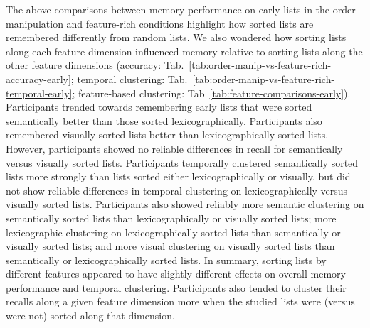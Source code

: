 \documentclass[11pt]{article}
\newcommand{\abbreviations}{S1}
\begin{document}
\begin{table}[tp]
\centering
\tiny

    
\caption{\textbf{Comparing temporal clustering on early lists in different order manipulation
conditions.} The $t$-tests reported in the table were
carried out across-participants, and reflect data aggregated across all early lists
from each participant. Abbreviations used in this table are defined in
Table~\abbreviations.}

\label{tab:order-temporal-comparisons-early}
\end{table}

\begin{table}[tp]
\centering
\tiny

    
\caption{\textbf{Comparing feature-based clustering on early lists in different order manipulation
conditions.} The $t$-tests reported in the table were
carried out across-participants, and reflect data aggregated across all early lists
from each participant. The feature used to compute clustering is shown before the colon in each row, and the
conditions being compared are shown after the colon.  Abbreviations used in this table are defined in
Table~\abbreviations.}

\label{tab:feature-comparisons-early}
\end{table}



The above comparisons between memory performance on early lists in the order
manipulation and feature-rich conditions highlight how sorted lists are
remembered differently from random lists. We also wondered how sorting lists
along each feature dimension influenced memory relative to sorting lists along
the other feature dimensions (accuracy:
Tab.~\ref{tab:order-manip-vs-feature-rich-accuracy-early}; temporal clustering:
Tab.~\ref{tab:order-manip-vs-feature-rich-temporal-early}; feature-based
clustering: Tab~\ref{tab:feature-comparisons-early}). Participants trended
towards remembering early lists that were sorted semantically better than those
sorted lexicographically. Participants also remembered visually sorted lists
better than lexicographically sorted lists. However, participants showed no
reliable differences in recall for semantically versus visually sorted lists.
Participants temporally clustered semantically sorted lists more strongly than
lists sorted either lexicographically or visually, but did not show reliable
differences in temporal clustering on lexicographically versus visually sorted
lists. Participants also showed reliably more semantic clustering on
semantically sorted lists than lexicographically or visually sorted lists; more
lexicographic clustering on lexicographically sorted lists than semantically or
visually sorted lists; and more visual clustering on visually sorted lists than
semantically or lexicographically sorted lists. In summary, sorting lists by
different features appeared to have slightly different effects on overall
memory performance and temporal clustering. Participants also tended to cluster
their recalls along a given feature dimension more when the studied lists were
(versus were not) sorted along that dimension.
\end{document}
